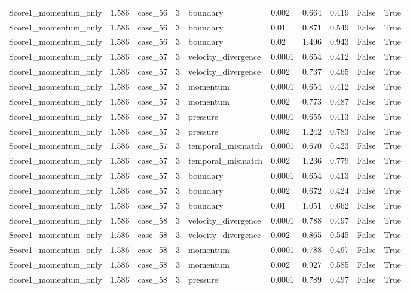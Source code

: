 \begin{longtable}{llllllllll}
Score1\_momentum\_only & 1.586 & case\_56 & 3 & boundary & 0.002 & 0.664 & 0.419 & False & True \\
Score1\_momentum\_only & 1.586 & case\_56 & 3 & boundary & 0.01 & 0.871 & 0.549 & False & True \\
Score1\_momentum\_only & 1.586 & case\_56 & 3 & boundary & 0.02 & 1.496 & 0.943 & False & True \\
Score1\_momentum\_only & 1.586 & case\_57 & 3 & velocity\_divergence & 0.0001 & 0.654 & 0.412 & False & True \\
Score1\_momentum\_only & 1.586 & case\_57 & 3 & velocity\_divergence & 0.002 & 0.737 & 0.465 & False & True \\
Score1\_momentum\_only & 1.586 & case\_57 & 3 & momentum & 0.0001 & 0.654 & 0.412 & False & True \\
Score1\_momentum\_only & 1.586 & case\_57 & 3 & momentum & 0.002 & 0.773 & 0.487 & False & True \\
Score1\_momentum\_only & 1.586 & case\_57 & 3 & pressure & 0.0001 & 0.655 & 0.413 & False & True \\
Score1\_momentum\_only & 1.586 & case\_57 & 3 & pressure & 0.002 & 1.242 & 0.783 & False & True \\
Score1\_momentum\_only & 1.586 & case\_57 & 3 & temporal\_mismatch & 0.0001 & 0.670 & 0.423 & False & True \\
Score1\_momentum\_only & 1.586 & case\_57 & 3 & temporal\_mismatch & 0.002 & 1.236 & 0.779 & False & True \\
Score1\_momentum\_only & 1.586 & case\_57 & 3 & boundary & 0.0001 & 0.654 & 0.413 & False & True \\
Score1\_momentum\_only & 1.586 & case\_57 & 3 & boundary & 0.002 & 0.672 & 0.424 & False & True \\
Score1\_momentum\_only & 1.586 & case\_57 & 3 & boundary & 0.01 & 1.051 & 0.662 & False & True \\
Score1\_momentum\_only & 1.586 & case\_58 & 3 & velocity\_divergence & 0.0001 & 0.788 & 0.497 & False & True \\
Score1\_momentum\_only & 1.586 & case\_58 & 3 & velocity\_divergence & 0.002 & 0.865 & 0.545 & False & True \\
Score1\_momentum\_only & 1.586 & case\_58 & 3 & momentum & 0.0001 & 0.788 & 0.497 & False & True \\
Score1\_momentum\_only & 1.586 & case\_58 & 3 & momentum & 0.002 & 0.927 & 0.585 & False & True \\
Score1\_momentum\_only & 1.586 & case\_58 & 3 & pressure & 0.0001 & 0.789 & 0.497 & False & True \\

\end{longtable}
